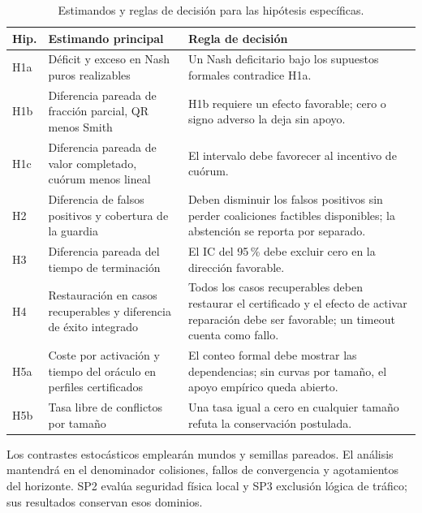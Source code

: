 \begin{table}[H]
  \centering
  \caption{Estimandos y reglas de decisión para las hipótesis específicas.}
  \label{tab:hypothesis-decision-rules}
  \scriptsize
  \setlength{\tabcolsep}{2pt}
  \begin{tabularx}{\textwidth}{p{1.0cm} p{5.0cm} Y}
    \toprule
    Hip. & Estimando principal & Regla de decisión \\
    \midrule
    H1a & Déficit y exceso en Nash puros realizables &
    Un Nash deficitario bajo los supuestos formales contradice H1a. \\
    H1b & Diferencia pareada de fracción parcial, QR menos Smith &
    H1b requiere un efecto favorable; cero o signo adverso la deja sin apoyo. \\
    H1c & Diferencia pareada de valor completado, cuórum menos lineal &
    El intervalo debe favorecer al incentivo de cuórum. \\
    H2 & Diferencia de falsos positivos y cobertura de la guardia &
    Deben disminuir los falsos positivos sin perder coaliciones factibles
    disponibles; la abstención se reporta por separado. \\
    H3 & Diferencia pareada del tiempo de terminación &
    El IC del 95\,\% debe excluir cero en la dirección favorable. \\
    H4 & Restauración en casos recuperables y diferencia de éxito integrado &
    Todos los casos recuperables deben restaurar el certificado y el efecto de
    activar reparación debe ser favorable; un timeout cuenta como fallo. \\
    H5a & Coste por activación y tiempo del oráculo en perfiles certificados &
    El conteo formal debe mostrar las dependencias; sin curvas por tamaño, el apoyo empírico queda abierto. \\
    H5b & Tasa libre de conflictos por tamaño &
    Una tasa igual a cero en cualquier tamaño refuta la conservación postulada. \\
    \bottomrule
  \end{tabularx}
  \viuownsource
\end{table}

Los contrastes estocásticos emplearán mundos y semillas pareados. El análisis
mantendrá en el denominador colisiones, fallos de convergencia y agotamientos del
horizonte. SP2 evalúa seguridad física local y SP3 exclusión lógica de tráfico;
sus resultados conservan esos dominios.
